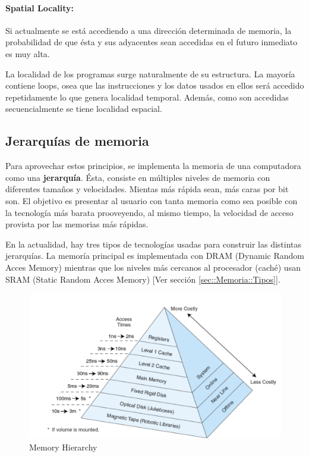 \paragraph{Spatial Locality:} Si actualmente se está accediendo a una dirección determinada de memoria, la probabilidad de que ésta y sus adyacentes sean accedidas en el futuro inmediato es muy alta.

La localidad de los programas surge naturalmente de su estructura. La mayoría contiene loops, osea que las instrucciones y los datos usados en ellos será accedido repetidamente lo que genera localidad temporal. Además, como son accedidas secuencialmente se tiene localidad espacial.

\subsection{Jerarquías de memoria}
Para aprovechar estos principios, se implementa la memoria de una computadora como una \textbf{jerarquía}. Ésta, consiste en múltiples niveles de memoria con diferentes tamaños y velocidades. Mientas más rápida sean, más caras por bit son. El objetivo es presentar al usuario con tanta memoria como sea posible con la tecnología más barata prooveyendo, al mismo tiempo, la velocidad de acceso provista por las memorias más rápidas.

En la actualidad, hay tres tipos de tecnologías usadas para construir las distintas jerarquías. La memoría principal es implementada con DRAM (Dynamic Random Acces Memory) mientras que los niveles más cercanos al procesador (caché) usan SRAM (Static Random Acces Memory)  [Ver sección \ref{sec::Memoria::Tipos}].

\begin{figure}[ht]
	\centering
	\includegraphics[width=1\textwidth]{imagenes/memory-heriarchy}
	\caption{Memory Hierarchy}
	\label{fig:memory-hierarchy}
\end{figure}

